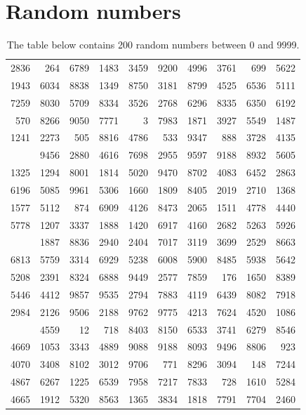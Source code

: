\documentclass[
]{book}
\begin{document}
\hypertarget{appendix-appendices}{%
\appendix}


\hypertarget{app-randomnumbers}{%
\chapter{Random numbers}\label{app-randomnumbers}}

\begin{table}

\caption{\label{tab:A1}The table below contains 200 random numbers between 0 and 9999.}
\centering
\begin{tabular}[t]{rrrrrrrrrr}
\toprule
 &  &  &  &  &  &  &  &  & \\
\midrule
2836 & 264 & 6789 & 1483 & 3459 & 9200 & 4996 & 3761 & 699 & 5622\\
1943 & 6034 & 8838 & 1349 & 8750 & 3181 & 8799 & 4525 & 6536 & 5111\\
7259 & 8030 & 5709 & 8334 & 3526 & 2768 & 6296 & 8335 & 6350 & 6192\\
570 & 8266 & 9050 & 7771 & 3 & 7983 & 1871 & 3927 & 5549 & 1487\\
1241 & 2273 & 505 & 8816 & 4786 & 533 & 9347 & 888 & 3728 & 4135\\
\addlinespace
6688 & 9456 & 2880 & 4616 & 7698 & 2955 & 9597 & 9188 & 8932 & 5605\\
1325 & 1294 & 8001 & 1814 & 5020 & 9470 & 8702 & 4083 & 6452 & 2863\\
6196 & 5085 & 9961 & 5306 & 1660 & 1809 & 8405 & 2019 & 2710 & 1368\\
1577 & 5112 & 874 & 6909 & 4126 & 8473 & 2065 & 1511 & 4778 & 4440\\
5778 & 1207 & 3337 & 1888 & 1420 & 6917 & 4160 & 2682 & 5263 & 5926\\
\addlinespace
6635 & 1887 & 8836 & 2940 & 2404 & 7017 & 3119 & 3699 & 2529 & 8663\\
6813 & 5759 & 3314 & 6929 & 5238 & 6008 & 5900 & 8485 & 5938 & 5642\\
5208 & 2391 & 8324 & 6888 & 9449 & 2577 & 7859 & 176 & 1650 & 8389\\
5446 & 4412 & 9857 & 9535 & 2794 & 7883 & 4119 & 6439 & 8082 & 7918\\
2984 & 2126 & 9506 & 2188 & 9762 & 9775 & 4213 & 7624 & 4520 & 1086\\
\addlinespace
371 & 4559 & 12 & 718 & 8403 & 8150 & 6533 & 3741 & 6279 & 8546\\
4669 & 1053 & 3343 & 4889 & 9088 & 9188 & 8093 & 9496 & 8806 & 923\\
4070 & 3408 & 8102 & 3012 & 9706 & 771 & 8296 & 3094 & 148 & 7244\\
4867 & 6267 & 1225 & 6539 & 7958 & 7217 & 7833 & 728 & 1610 & 5284\\
4665 & 1912 & 5320 & 8563 & 1365 & 3834 & 1818 & 7791 & 7704 & 2460\\
\bottomrule
\end{tabular}
\end{table}
\end{document}
